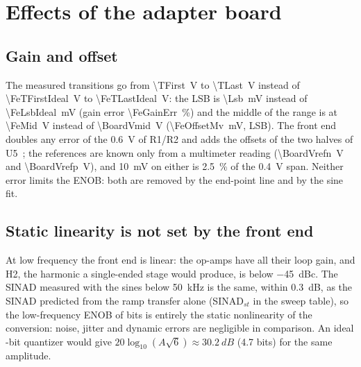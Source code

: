 \section{Effects of the adapter board}
\label{sec:board}

\subsection{Gain and offset}
The measured transitions go from \SI{\TFirst}{V} to \SI{\TLast}{V} instead of
\SI{\FeTFirstIdeal}{V} to \SI{\FeTLastIdeal}{V}: the LSB is \SI{\Lsb}{mV} instead of
\SI{\FeLsbIdeal}{mV} (gain error \SI{\FeGainErr}{\percent}) and the middle of the range is at
\SI{\FeMid}{V} instead of \SI{\BoardVmid}{V} (\SI{\FeOffsetMv}{mV}, \FeOffsetLsb{} LSB). The
front end doubles any error of the \SI{0.6}{V} of R1/R2 and adds the offsets of the two halves of
U5~\cite{lmv358}; the references are known only from a multimeter reading
(\SI{\BoardVrefn}{V} and \SI{\BoardVrefp}{V}), and \SI{10}{mV} on either is \SI{2.5}{\percent} of the
\SI{0.4}{V} span. Neither error limits the ENOB: both are removed by the
end-point line and by the sine fit.

\subsection{Static linearity is not set by the front end}
At low frequency the front end is linear: the op-amps have all their loop gain, and H2, the
harmonic a single-ended stage would produce, is below \SI{-45}{dBc}. The SINAD measured with
the sines below \SI{50}{kHz} is the same, within \SI{0.3}{dB}, as the SINAD predicted from the
ramp transfer alone (SINAD$_{st}$ in the sweep table), so the low-frequency ENOB of
\SineRefEnob{} bits is entirely the static nonlinearity of the conversion: noise, jitter and
dynamic errors are negligible in comparison. An ideal \AdcBits-bit quantizer would give
$20 \log_{10}(A \sqrt{6}) \approx \SI{30.2}{dB}$ (4.7 bits) for the same amplitude.

